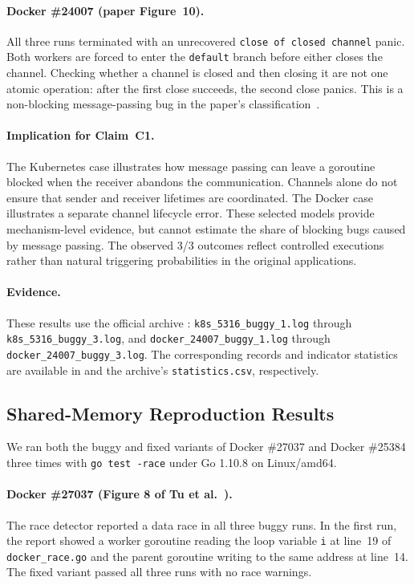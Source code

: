 \paragraph{Docker \#24007 (paper Figure~10).}
All three runs terminated with an unrecovered
\texttt{close of closed channel} panic. Both workers are forced to
enter the \texttt{default} branch before either closes the channel.
Checking whether a channel is closed and then closing it are not one
atomic operation: after the first close succeeds, the second close
panics. This is a non-blocking message-passing bug in the paper's
classification~\cite{tu2019go}.

\paragraph{Implication for Claim~C1.}
The Kubernetes case illustrates how message passing can leave a
goroutine blocked when the receiver abandons the communication.
Channels alone do not ensure that sender and receiver lifetimes are
coordinated. The Docker case illustrates a separate channel lifecycle
error. These selected models provide mechanism-level evidence, but
cannot estimate the share of blocking bugs caused by message passing.
The observed 3/3 outcomes reflect controlled executions rather than
natural triggering probabilities in the original applications.

\paragraph{Evidence.}
These results use the official archive
:
\texttt{k8s\_5316\_buggy\_1.log} through
\texttt{k8s\_5316\_buggy\_3.log}, and
\texttt{docker\_24007\_buggy\_1.log} through
\texttt{docker\_24007\_buggy\_3.log}.
The corresponding records and indicator statistics are available in
 and the archive's
\texttt{statistics.csv}, respectively.

\subsection{Shared-Memory Reproduction Results}
\label{sec:shared-memory-results}

We ran both the buggy and fixed variants of Docker \#27037 and
Docker \#25384 three times with \texttt{go test -race} under
Go 1.10.8 on Linux/amd64.

\paragraph{Docker \#27037 (Figure 8 of Tu et al.~\cite{tu2019go}).}
The race detector reported a data race in all three buggy runs.
In the first run, the report showed a worker goroutine reading the
loop variable \texttt{i} at line~19 of \texttt{docker\_race.go}
and the parent goroutine writing to the same address at line~14.
The fixed variant passed all three runs with no race warnings.

